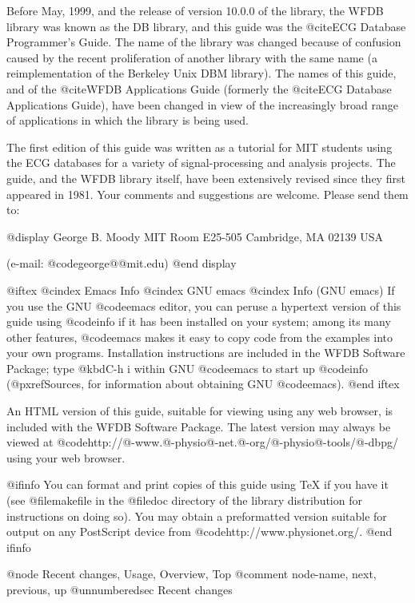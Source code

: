 Before May, 1999, and the release of version 10.0.0 of the library, the
WFDB library was known as the DB library, and this guide was the @cite{ECG
Database Programmer's Guide}.  The name of the library was changed because
of confusion caused by the recent proliferation of another library with
the same name (a reimplementation of the Berkeley Unix DBM library).
The names of this guide, and of the @cite{WFDB Applications Guide} (formerly
the @cite{ECG Database Applications Guide}), have been changed in view of
the increasingly broad range of applications in which the library is being
used.

The first edition of this guide was written as a tutorial for MIT
students using the ECG databases for a variety of signal-processing and
analysis projects.  The guide, and the WFDB library itself, have been
extensively revised since they first appeared in 1981.  Your comments
and suggestions are welcome.  Please send them to:

@display
George B. Moody
MIT Room E25-505
Cambridge, MA 02139
USA

(e-mail: @code{george@@mit.edu})
@end display

@iftex
@cindex Emacs Info
@cindex GNU emacs
@cindex Info (GNU emacs)
If you use the GNU @code{emacs} editor, you can peruse a hypertext
version of this guide using @code{info} if it has been installed on your
system; among its many other features, @code{emacs} makes it easy to
copy code from the examples into your own programs.  Installation
instructions are included in the WFDB Software Package; type @kbd{C-h i}
within GNU @code{emacs} to start up @code{info} (@pxref{Sources}, for
information about obtaining GNU @code{emacs}).
@end iftex

An HTML version of this guide, suitable for viewing using any web browser,
is included with the WFDB Software Package.  The latest version may always be
viewed at @code{http://@-www.@-physio@-net.@-org/@-physio@-tools/@-dbpg/} using your web
browser.

@ifinfo
You can format and print copies of this guide using TeX if you have it (see
@file{makefile} in the @file{doc} directory of the library distribution for
instructions on doing so).  You may obtain a preformatted version suitable for
output on any PostScript device from @code{http://www.physionet.org/}.
@end ifinfo

@node     Recent changes, Usage, Overview, Top
@comment  node-name,  next,  previous,  up
@unnumberedsec Recent changes

